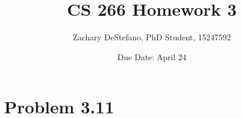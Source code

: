 \documentclass[11pt,psfig]{article}
\begin{document}
\setlength{\parskip}{1.2ex plus0.3ex minus 0.3ex}


\thispagestyle{empty} \pagestyle{myheadings} 



\title{CS 266 Homework 3}
\author{Zachary DeStefano, PhD Student, 15247592}
\date{Due Date: April 24}

\maketitle

\vfill\eject

\section*{Problem 3.11}
\end{document}
